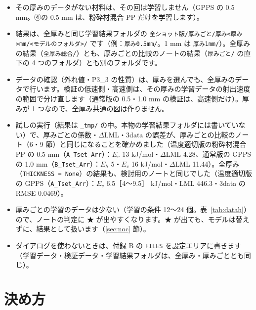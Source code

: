\documentclass[paper=a4paper,fontsize=10.5pt,line_length=44zw,number_of_lines=40]{jlreq}
\begin{document}
\begin{itemize}[itemsep=0.3ex,topsep=0.4ex]
\item その厚みのデータがない材料は、その回は学習しません（GPPS の 0.5 mm。④の 0.5 mm は、粉砕材混合 PP だけを学習します）。
\item 結果は、全厚みと同じ学習結果フォルダの \texttt{全ショット版/\allowbreak{}厚みごと/\allowbreak{}厚み<厚み>mm/\allowbreak{}<モデルのフォルダ>/\allowbreak{}} です（例：\texttt{厚み0.5mm/\allowbreak{}}。1 mm は \texttt{厚み1mm/\allowbreak{}}）。全厚みの結果（\texttt{全厚み総合/\allowbreak{}}）とも、厚みごとの比較のノートの結果（\texttt{厚みごと/\allowbreak{}} の直下の 4 つのフォルダ）とも別のフォルダです。
\item データの確認（外れ値・P3\_3 の性質）は、厚みを選んでも、全厚みのデータで行います。検証の低速側・高速側は、その厚みの学習データの射出速度の範囲で分け直します（通常版の 0.5・1.0 mm の検証は、高速側だけ）。厚みが 1 つなので、全厚み共通の図は作りません。
\item 試しの実行（結果は \texttt{\_\allowbreak{}tmp/\allowbreak{}} の中。本物の学習結果フォルダには書いていない）で、厚みごとの係数・$\Delta$LML・3data の誤差が、厚みごとの比較のノート（6・9 節）と同じになることを確かめました（温度適切版の粉砕材混合 PP の 0.5 mm（\texttt{A\_\allowbreak{}Tset\_\allowbreak{}Arr}）：$E_v$ 13 kJ/mol・$\Delta$LML 4.28、通常版の GPPS の 1.0 mm（\texttt{B\_\allowbreak{}Tset\_\allowbreak{}Arr}）：$E_h$ 5・$E_v$ 16 kJ/mol・$\Delta$LML 11.44）。全厚み（\texttt{THICKNESS = None}）の結果も、検討用のノートと同じでした（温度適切版の GPPS（\texttt{A\_\allowbreak{}Tset\_\allowbreak{}Arr}）：$E_v$ 6.5［4〜9.5］ kJ/mol・LML 446.3・3data の RMSE 0.0469）。
\item 厚みごとの学習のデータは少ない（学習の条件 12〜24 個。表~\ref{tab:datah}）ので、ノートの判定に ★ が出やすくなります。★ が出ても、モデルは替えずに、結果として扱います（\ref{sec:noc} 節）。
\item ダイアログを使わないときは、付録 B の \texttt{FILES} を設定エリアに書きます（学習データ・検証データ・学習結果フォルダは、全厚み・厚みごととも同じ）。
\end{itemize}

\section{決め方}
\end{document}
